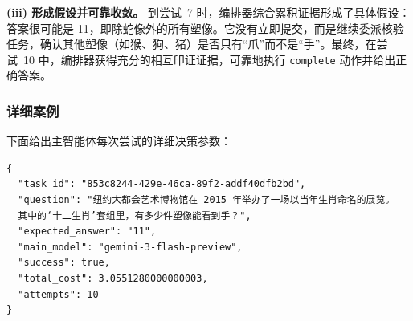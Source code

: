 \textbf{(iii) 形成假设并可靠收敛。}
到尝试~7 时，编排器综合累积证据形成了具体假设：答案很可能是 11，即除蛇像外的所有塑像。它没有立即提交，而是继续委派核验任务，确认其他塑像（如猴、狗、猪）是否只有“爪”而不是“手”。最终，在尝试~10 中，编排器获得充分的相互印证证据，可靠地执行 \texttt{complete} 动作并给出正确答案。


\subsubsection{详细案例}

下面给出主智能体每次尝试的详细决策参数：
\begin{tcolorbox}[
  title={\textbf{\small 案例元数据（JSON）}},
  boxrule=1pt, arc=0mm,
  colback=gray!5, colframe=gray!70,
  breakable, before skip=8pt, after skip=10pt,
  pad at break=2mm, parbox=false
]
\begin{verbatim}
{
  "task_id": "853c8244-429e-46ca-89f2-addf40dfb2bd",
  "question": "纽约大都会艺术博物馆在 2015 年举办了一场以当年生肖命名的展览。
  其中的‘十二生肖’套组里，有多少件塑像能看到手？",
  "expected_answer": "11",
  "main_model": "gemini-3-flash-preview",
  "success": true,
  "total_cost": 3.0551280000000003,
  "attempts": 10
}
\end{verbatim}
\end{tcolorbox}



\label{app:C1_gaia}

%


